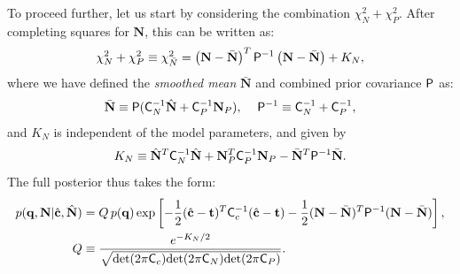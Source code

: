 \documentclass[a4paper,11pt]{article}
\newcommand{\vN}{\mathbf{N}}
\begin{document}
      To proceed further, let us start by considering the combination $\chi^2_N+\chi^2_P$. After completing squares for $\vN$, this can be written as:
      \begin{equation}
        \chi^2_N+\chi^2_P\equiv\chi^2_{\bar{N}}=\left(\vN-\bar{\vN}\right)^T{\sf P}^{-1}\left(\vN-\bar{\vN}\right)+K_N,
      \end{equation}
      where we have defined the \emph{smoothed mean} $\bar{\vN}$ and combined prior covariance ${\sf P}$ as:
      \begin{align}\label{eq:priorcov}
        \bar{\vN}\equiv{\sf P}({\sf C}_N^{-1}\hat{\bf N}+{\sf C}_P^{-1}\vN_P),\hspace{12pt} {\sf P}^{-1}\equiv{\sf C}_N^{-1}+{\sf C}_P^{-1},
      \end{align}
      and $K_N$ is independent of the model parameters, and given by
      \begin{equation}
        K_N\equiv\hat{\bf N}^T{\sf C}^{-1}_N\hat{\bf N}+\vN_P^T{\sf C}_P^{-1}\vN_P-\bar{\vN}^T{\sf P}^{-1}\bar{\vN}.
      \end{equation}
      The full posterior thus takes the form:
      \begin{align}
        p({\bf q},\vN|\hat{\bf c},\hat{\bf N})&=Q\,p({\bf q})\exp\left[-\frac{1}{2}(\hat{\bf c}-{\bf t})^T{\sf C}^{-1}_c(\hat{\bf c}-{\bf t})-\frac{1}{2}(\vN-\bar{\vN})^T{\sf P}^{-1}(\vN-\bar{\vN})\right],\\
        Q&\equiv\frac{e^{-K_N/2}}{\sqrt{{\rm det}(2\pi{\sf C}_c){\rm det}(2\pi{\sf C}_N){\rm det}(2\pi{\sf C}_P)}}.
      \end{align}
\end{document}
